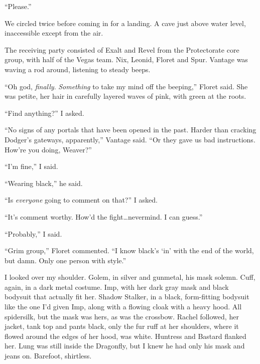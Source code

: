 ``Please.''



\sectionbreak



We circled twice before coming in for a landing.  A cave just above water level, inaccessible except from the air.



The receiving party consisted of Exalt and Revel from the Protectorate core group, with half of the Vegas team.  Nix, Leonid, Floret and Spur.  Vantage was waving a rod around, listening to steady beeps.



``Oh god, \emph{finally}.  \emph{Something} to take my mind off the beeping,'' Floret said.  She was petite, her hair in carefully layered waves of pink, with green at the roots.



``Find anything?'' I asked.



``No signs of any portals that have been opened in the past.  Harder than cracking Dodger's gateways, apparently,'' Vantage said.  ``Or they gave us bad instructions.  How're you doing, Weaver?''



``I'm fine,'' I said.



``Wearing black,'' he said.



``Is \emph{everyone} going to comment on that?'' I asked.



``It's comment worthy.  How'd the fight\ldots nevermind.  I can guess.''



``Probably,'' I said.



``Grim group,'' Floret commented.  ``I know black's `in' with the end of the world, but damn.  Only one person with style.''



I looked over my shoulder.  Golem, in silver and gunmetal, his mask solemn.  Cuff, again, in a dark metal costume.  Imp, with her dark gray mask and black bodysuit that actually fit her.  Shadow Stalker, in a black, form-fitting bodysuit like the one I'd given Imp, along with a flowing cloak with a heavy hood.  All spidersilk, but the mask was hers, as was the crossbow.  Rachel followed, her jacket, tank top and pants black, only the fur ruff at her shoulders, where it flowed around the edges of her hood, was white.  Huntress and Bastard flanked her.  Lung was still inside the Dragonfly, but I knew he had only his mask and jeans on.  Barefoot, shirtless.



